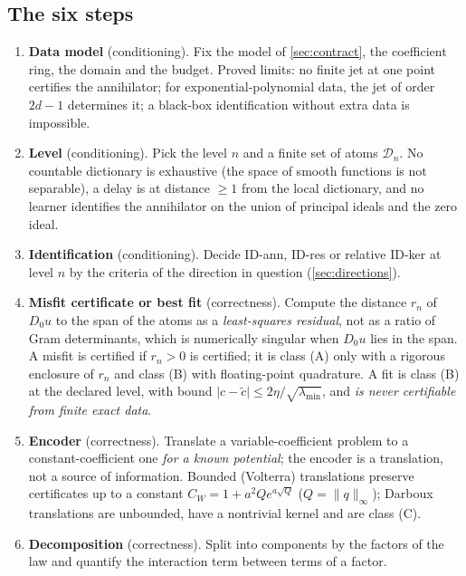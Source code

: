 \documentclass[11pt]{article}
\theoremstyle{plain}
\theoremstyle{definition}
\theoremstyle{remark}
\begin{document}
\subsection{The six steps}
\begin{enumerate}
\item \textbf{Data model} (conditioning). Fix the model of \cref{sec:contract}, the coefficient ring, the domain and the budget.
  Proved limits: no finite jet at one point certifies the annihilator; for exponential-polynomial data, the jet of order $2d-1$ determines it; a black-box
  identification without extra data is impossible.
\item \textbf{Level} (conditioning). Pick the level $n$ and a finite set of atoms $\mathcal D_n$. No countable dictionary is exhaustive (the space of smooth functions
  is not separable), a delay is at distance $\ge1$ from the local dictionary, and no learner identifies the annihilator on the union of principal ideals and the zero ideal.
\item \textbf{Identification} (conditioning). Decide ID-ann, ID-res or relative ID-ker at level $n$ by the criteria of the direction in question (\cref{sec:directions}).
\item \textbf{Misfit certificate or best fit} (correctness). Compute the distance $r_n$ of $D_0u$ to the span of the atoms as a \emph{least-squares residual}, not as a ratio of Gram determinants, which is numerically
  singular when $D_0u$ lies in the span. A misfit is certified if $r_n>0$ is certified; it is class (A) only with a rigorous enclosure of $r_n$ and class (B) with floating-point quadrature.
  A fit is class (B) at the declared level, with bound $\lvert c-\tilde c\rvert\le2\eta/\sqrt{\lambda_{\min}}$, and \emph{is never certifiable from finite exact data}.
\item \textbf{Encoder} (correctness). Translate a variable-coefficient problem to a constant-coefficient one \emph{for a known potential}; the encoder is a translation, not a source of information.
  Bounded (Volterra) translations preserve certificates up to a constant $C_W=1+a^2Qe^{a\sqrt Q}$ ($Q=\lVert q\rVert_\infty$); Darboux translations are unbounded, have a nontrivial kernel and are class (C).
\item \textbf{Decomposition} (correctness). Split into components by the factors of the law and quantify the interaction term between terms of a factor.
\end{enumerate}
\end{document}
